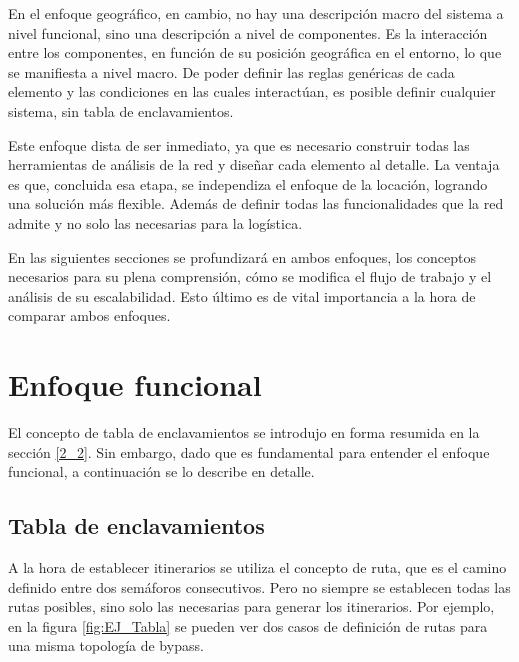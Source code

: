 	En el enfoque geográfico, en cambio, no hay una descripción macro del sistema a nivel funcional, sino una descripción a nivel de componentes. Es la interacción entre los componentes, en función de su posición geográfica en el entorno, lo que se manifiesta a nivel macro. De poder definir las reglas genéricas de cada elemento y las condiciones en las cuales interactúan, es posible definir cualquier sistema, sin tabla de enclavamientos.
	
	Este enfoque dista de ser inmediato, ya que es necesario construir todas las herramientas de análisis de la red y diseñar cada elemento al detalle. La ventaja es que, concluida esa etapa, se independiza el enfoque de la locación, logrando una solución más flexible. Además de definir todas las funcionalidades que la red admite y no solo las necesarias para la logística.
	
	En las siguientes secciones se profundizará en ambos enfoques, los conceptos necesarios para su plena comprensión, cómo se modifica el flujo de trabajo y el análisis de su escalabilidad. Esto último es de vital importancia a la hora de comparar ambos enfoques.
	
	

\section{Enfoque funcional}
	\label{Incompletitud}

	El concepto de tabla de enclavamientos\cite{cite21,cite22} se introdujo en forma resumida en la sección \ref{2_2}. Sin embargo, dado que es fundamental para entender el enfoque funcional, a continuación se lo describe en detalle.%
		
	\subsection{Tabla de enclavamientos}
	\label{Tabla_Enclavamientos}
		A la hora de establecer itinerarios se utiliza el concepto de ruta, que es el camino definido entre dos semáforos consecutivos. Pero no siempre se establecen todas las rutas posibles, sino solo las necesarias para generar los itinerarios. Por ejemplo, en la figura \ref{fig:EJ_Tabla} se pueden ver dos casos de definición de rutas para una misma topología de bypass.
		

